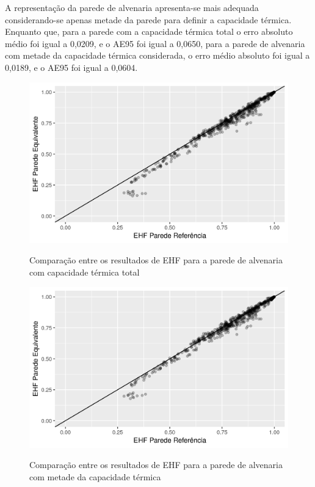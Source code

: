 \documentclass[brazil,hardcopy,openany,a4paper]{ufscthesis}
\begin{document}
		A representação da parede de alvenaria apresenta-se mais adequada considerando-se apenas metade da parede para definir a capacidade térmica. Enquanto que, para a parede com a capacidade térmica total o erro absoluto médio foi igual a 0,0209, e o AE95 foi igual a 0,0650, para a parede de alvenaria com metade da capacidade térmica considerada, o erro médio absoluto foi igual a 0,0189, e o AE95 foi igual a 0,0604.
		
		\begin{figure}[H]
			\centering
			\caption{Comparação entre os resultados de EHF para a parede de alvenaria com capacidade térmica total}
			\includegraphics[width=1\linewidth]{img/paredeeq_EHF_par2a_scatter.png}
			\label{fig:par2a_scatter}
		\end{figure}
		\begin{figure}[H]
			\centering
			\caption{Comparação entre os resultados de EHF para a parede de alvenaria com metade da capacidade térmica}
			\includegraphics[width=1\linewidth]{img/paredeeq_EHF_par2b_scatter.png}
			\label{fig:par2b_scatter}
		\end{figure}
		
\end{document}
